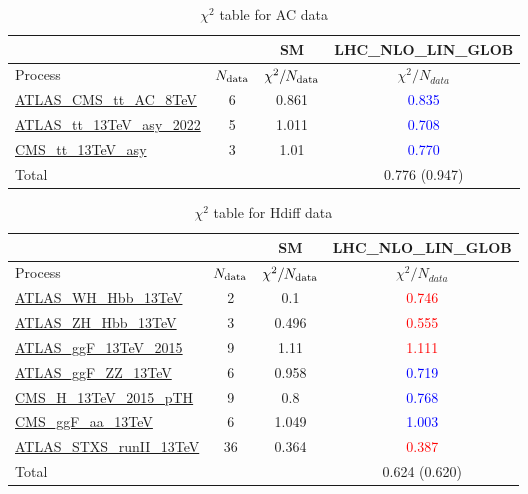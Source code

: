 \documentclass{article}
\begin{document}
\begin{table}[H]
\centering
\begin{tabular}{|l|c|c|c|}
\hline
 \multicolumn{2}{|c|}{} & SM& LHC_NLO_LIN_GLOB\\ \hline
Process & $N_{\rm data}$ & $\chi^ 2/N_{\rm data}$& $\chi^ 2/N_{data}$\\ \hline
\href{https://arxiv.org}{ATLAS_CMS_tt_AC_8TeV} & 6 & 0.861 & \textcolor{blue}                            {0.835} \\ \hline
\href{https://arxiv.org}{ATLAS_tt_13TeV_asy_2022} & 5 & 1.011 & \textcolor{blue}                            {0.708} \\ \hline
\href{https://arxiv.org}{CMS_tt_13TeV_asy} & 3 & 1.01 & \textcolor{blue}                            {0.770} \\ \hline
\hline Total & &  & 0.776 (0.947) \\ \hline
\end{tabular}
\caption{$\chi^2$ table for AC data}
\end{table}
\begin{table}[H]
\centering
\begin{tabular}{|l|c|c|c|}
\hline
 \multicolumn{2}{|c|}{} & SM& LHC_NLO_LIN_GLOB\\ \hline
Process & $N_{\rm data}$ & $\chi^ 2/N_{\rm data}$& $\chi^ 2/N_{data}$\\ \hline
\href{https://arxiv.org}{ATLAS_WH_Hbb_13TeV} & 2 & 0.1 & \textcolor{red}                            {0.746} \\ \hline
\href{https://arxiv.org}{ATLAS_ZH_Hbb_13TeV} & 3 & 0.496 & \textcolor{red}                            {0.555} \\ \hline
\href{https://arxiv.org}{ATLAS_ggF_13TeV_2015} & 9 & 1.11 & \textcolor{red}                            {1.111} \\ \hline
\href{https://arxiv.org}{ATLAS_ggF_ZZ_13TeV} & 6 & 0.958 & \textcolor{blue}                            {0.719} \\ \hline
\href{https://arxiv.org}{CMS_H_13TeV_2015_pTH} & 9 & 0.8 & \textcolor{blue}                            {0.768} \\ \hline
\href{https://arxiv.org}{CMS_ggF_aa_13TeV} & 6 & 1.049 & \textcolor{blue}                            {1.003} \\ \hline
\href{https://arxiv.org}{ATLAS_STXS_runII_13TeV} & 36 & 0.364 & \textcolor{red}                            {0.387} \\ \hline
\hline Total & &  & 0.624 (0.620) \\ \hline
\end{tabular}
\caption{$\chi^2$ table for Hdiff data}
\end{table}
\end{document}
